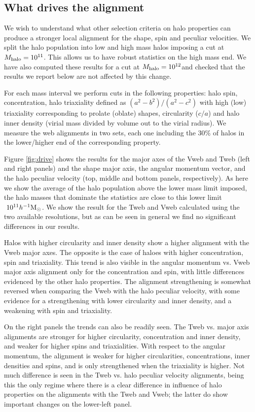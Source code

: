 \documentclass[useAMS,usenatbib]{mn2e}
\newcommand{\hMsun}{{\ifmmode{h^{-1}{\rm
        {M_{\odot}}}}\else{$h^{-1}{\rm{M_{\odot}}}$~}\fi}}
\begin{document}
\subsection{What drives the alignment}

We wish to understand what other selection criteria on halo
properties can produce a stronger local alignment for the shape, spin
and peculiar velocities. We split the halo population into low and
high mass halos imposing a cut at $M_{\rm halo}=10^{11}$\hMsun. This
allows us to have robust statistics on the high mass end. We have also
computed these results for a cut at $M_{\rm halo}=10^{12}$\hMsun and
checked that the results we report below are not affected by this
change.

For each mass interval we perform cuts in the following properties:
halo spin, concentration, halo triaxiality defined as $(a^2-b^2)/(a^2-c^2)$ with
high (low) triaxiality corresponding to prolate (oblate) shapes,
circularity ($c/a$)  and halo inner density (virial mass divided by
volume out to the virial radius). We measure the web alignments in two
sets, each one including the $30\%$ of halos in the lower/higher end
of the corresponding property. 

Figure \ref{fig:drive} shows the results for the major axes of
the Vweb and Tweb (left and right panels) and the shape major axis,
the angular momentum vector, and the halo peculiar velocity (top, middle
and bottom panels, respectively).  As here we show the average
of the halo population above the lower mass limit imposed, the halo
masses that dominate the statistics are close to this lower limit $~10^{11}\hMsun$.
We show the result for the Tweb and Vweb calculated using the two
available resolutions, but as can be seen in general we find no
significant differences in our results.

Halos with higher circularity and inner density show
a higher alignment with the Vweb major axes.  The opposite is the case
of haloes with higher concentration, spin and triaxiality.  This trend
is also visible in the angular momentum vs. Vweb major axis alignment only
for the concentration and spin, with little differences evidenced by the
other halo properties.  The alignment strengthening is somewhat
reversed when comparing the Vweb with the halo peculiar velocity,
with some evidence for a strengthening with lower circularity and
inner density, and a weakening with spin and triaxiality.

On the right panels the trends can also be readily seen.  The Tweb
vs. major axis alignments are stronger for higher circularity,
concentration and inner density, and weaker for higher spins and
triaxialities.  With respect to the angular momentum, the alignment
is weaker for higher circularities, concentrations, inner densities and
spins, and is only strengthened when the triaxiality is higher.
Not much difference is seen in the Tweb vs. halo peculiar velocity
alignments, being this the only regime where there is a clear difference
in influence of halo properties on the alignments with the Tweb and Vweb;
the latter do show important changes on the lower-left panel.
\end{document}
